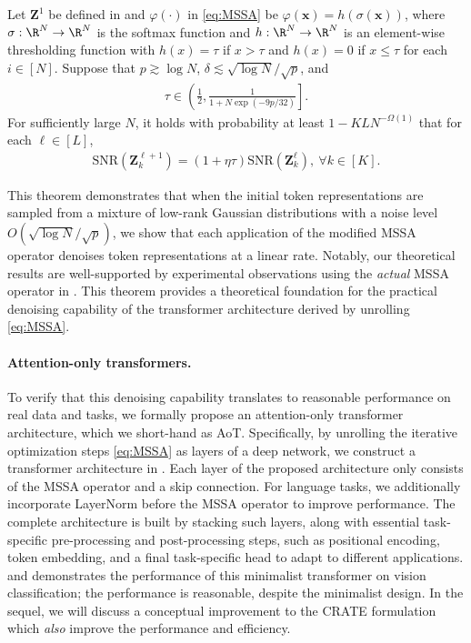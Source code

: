 \documentclass[../../book-main.tex]{subfiles}
\begin{document}
\begin{theorem}\label{thm:1}
    Let $\bm Z^{1}$ be defined in  and $\varphi(\cdot)$
    in \eqref{eq:MSSA} be
    $\varphi(\bm x) = h\left(\sigma(\bm x)\right)$,
    where $\sigma:\R^N \to \R^N$ is the softmax function and $h:\R^N
    \to \R^N$ is an element-wise thresholding function with $h(x) =
    \tau$ if \(x > \tau\) and \(h(x) = 0\) if \(x \leq \tau\) for
    each $i \in [N]$.
    Suppose that $p \gtrsim \log N$, $\delta \lesssim \sqrt{\log
    N}/\sqrt{p}$, and
    \begin{align*}
        \tau \in \left( \frac{1}{2},  \frac{1}{1+N\exp(-9p/32)} \right].
    \end{align*}
    For sufficiently large $N$, it holds with probability at least
    $1-KLN^{-\Omega(1)}$ that for each $\ell \in [L]$,
    \begin{align}\label{eq:SNR}
        \mathrm{SNR}(\bm Z_k^{\ell+1}) = (1+\eta\tau)
        \mathrm{SNR}(\bm Z_k^{\ell}),\ \forall k \in [K].
    \end{align}
\end{theorem}
This theorem demonstrates that when the initial token representations
are sampled from a mixture of low-rank Gaussian distributions with a
noise level $O(\sqrt{\log N}/\sqrt{p})$, we show that each
application of the modified MSSA operator  denoises token
representations at a linear
rate. Notably, our theoretical results are well-supported by
experimental observations using the \textit{actual} MSSA operator in
. This theorem provides a theoretical foundation for
the practical denoising capability of the transformer architecture
derived by unrolling \eqref{eq:MSSA}.

\paragraph{Attention-only transformers.} To verify that this
denoising capability translates to reasonable performance on real
data and tasks, we formally propose an attention-only transformer
architecture, which we short-hand as AoT. Specifically, by unrolling
the iterative optimization steps \eqref{eq:MSSA} as layers of a deep
network, we construct a transformer architecture in
. Each layer of the proposed architecture only
consists of the MSSA operator and a skip connection. For language
tasks, we additionally incorporate LayerNorm before the MSSA operator
to improve performance. The complete architecture is built by
stacking such layers, along with essential task-specific
pre-processing and post-processing steps, such as positional
encoding, token embedding, and a final task-specific head to adapt to
different applications.  and
demonstrates the performance of this minimalist transformer on vision
classification; the performance is reasonable, despite the minimalist
design. In the sequel, we will discuss a conceptual improvement to
the CRATE formulation which \textit{also} improve the performance and
efficiency.
\end{document}
